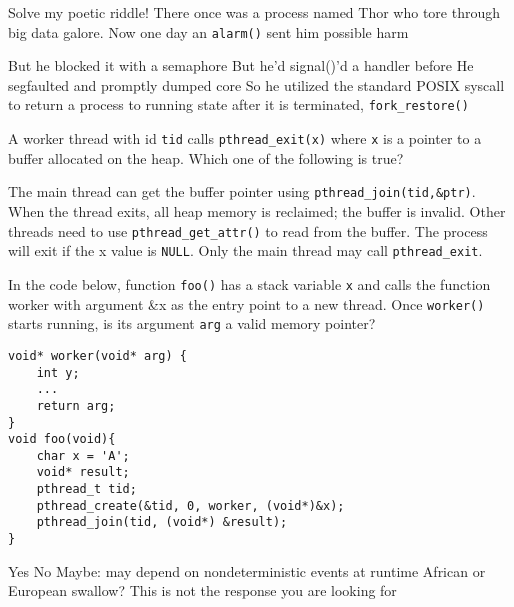 \variant
Solve my poetic riddle! There once was a process named Thor who tore through big data galore. Now one day an {\tt alarm()} sent him possible harm
\begin{answers}
\answer But he blocked it with a semaphore
\correctanswer But he'd signal()'d a handler before
\answer He segfaulted and promptly dumped core
\answer So he utilized the standard POSIX syscall to return a process to running state after it is terminated, {\tt fork_restore()}
\end{answers}
\begin{solution}
\end{solution}

\variant
A worker thread with id {\tt tid} calls {\tt pthread_exit(x)} where {\tt x} is a pointer to a buffer allocated on the heap. Which one of the following is true?
\begin{answers}
\correctanswer The main thread can get the buffer pointer using {\tt pthread_join(tid,\&ptr)}.
\answer When the thread exits, all heap memory is reclaimed; the buffer is invalid.
\answer Other threads need to use {\tt pthread_get_attr()} to read from the buffer.
\answer The process will exit if the x value is {\tt NULL}.
\answer Only the main thread may call {\tt pthread_exit}.
\end{answers}
\begin{solution}
\end{solution}

\variant
In the code below, function {\tt foo()} has a stack variable {\tt x} and calls the function worker with argument \&x as the entry point to a new thread. Once {\tt worker()} starts running, is its argument {\tt arg} a valid memory pointer?
\begin{verbatim}
void* worker(void* arg) {
    int y;
    ...
    return arg;
}
void foo(void){
    char x = 'A';
    void* result;
    pthread_t tid;
    pthread_create(&tid, 0, worker, (void*)&x);
    pthread_join(tid, (void*) &result);
}
\end{verbatim}
\begin{answers}
\correctanswer Yes
\answer No
\answer Maybe: may depend on nondeterministic events at runtime
\answer African or European swallow?
\answer This is not the response you are looking for
\end{answers}
\begin{solution}
\end{solution}

